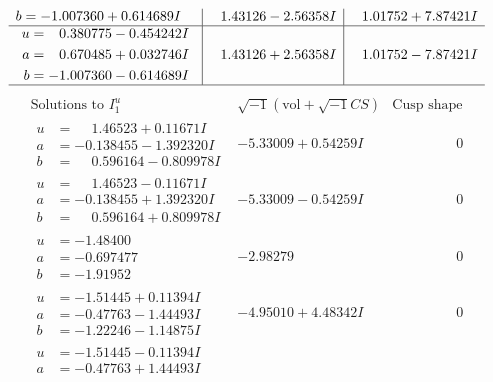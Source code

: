 \documentclass[1p]{elsarticle_modified}
\theoremstyle{definition}
\newcommand{\I}{\sqrt{-1}}
\begin{document}
$$\begin{array}{c|c|c}
\begin{aligned}
b &= -1.007360 + 0.614689 I\end{aligned}
 & \phantom{-}1.43126 - 2.56358 I & \phantom{-}1.01752 + 7.87421 I \\ \hline\begin{aligned}
u &= \phantom{-}0.380775 - 0.454242 I \\
a &= \phantom{-}0.670485 + 0.032746 I \\
b &= -1.007360 - 0.614689 I\end{aligned}
 & \phantom{-}1.43126 + 2.56358 I & \phantom{-}1.01752 - 7.87421 I\\
 \hline 
 \end{array}$$\newpage$$\begin{array}{c|c|c}  
\text{Solutions to }I^u_{1}& \I (\text{vol} + \sqrt{-1}CS) & \text{Cusp shape}\\
 \hline 
\begin{aligned}
u &= \phantom{-}1.46523 + 0.11671 I \\
a &= -0.138455 - 1.392320 I \\
b &= \phantom{-}0.596164 - 0.809978 I\end{aligned}
 & -5.33009 + 0.54259 I & \phantom{-0.000000 } 0 \\ \hline\begin{aligned}
u &= \phantom{-}1.46523 - 0.11671 I \\
a &= -0.138455 + 1.392320 I \\
b &= \phantom{-}0.596164 + 0.809978 I\end{aligned}
 & -5.33009 - 0.54259 I & \phantom{-0.000000 } 0 \\ \hline\begin{aligned}
u &= -1.48400\phantom{ +0.000000I} \\
a &= -0.697477\phantom{ +0.000000I} \\
b &= -1.91952\phantom{ +0.000000I}\end{aligned}
 & -2.98279\phantom{ +0.000000I} & \phantom{-0.000000 } 0 \\ \hline\begin{aligned}
u &= -1.51445 + 0.11394 I \\
a &= -0.47763 - 1.44493 I \\
b &= -1.22246 - 1.14875 I\end{aligned}
 & -4.95010 + 4.48342 I & \phantom{-0.000000 } 0 \\ \hline\begin{aligned}
u &= -1.51445 - 0.11394 I \\
a &= -0.47763 + 1.44493 I \\

\end{aligned}
\end{array}$$
\end{document}
